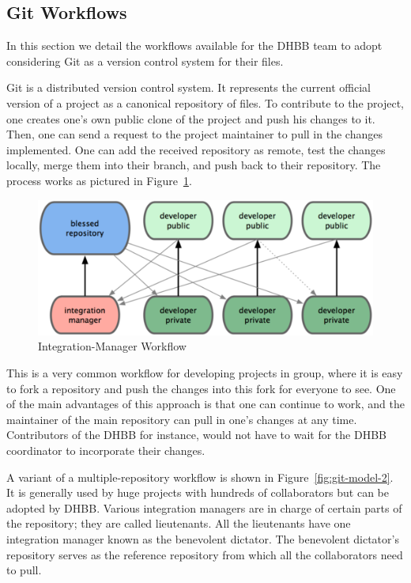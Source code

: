 \subsection{Git Workflows}

In this section we detail the workflows available for the DHBB team to
adopt considering Git as a version control system for their files.

Git is a distributed version control system. It represents the current
official version of a project as a canonical repository of files. To
contribute to the project, one creates one's own public clone of the
project and push his changes to it. Then, one can send a request to
the project maintainer to pull in the changes implemented. One can add
the received repository as remote, test the changes locally, merge
them into their branch, and push back to their repository. The process
works as pictured in Figure~\ref{fig:git-model-1}.

\begin{figure}[thbp]
  \centering
  \includegraphics[width=.8\textwidth]{git-model-1.png}
  \caption{Integration-Manager Workflow}\label{fig:git-model-1}
\end{figure}

This is a very common workflow for developing projects in group, where
it is easy to fork a repository and push the changes into this fork
for everyone to see. One of the main advantages of this approach is
that one can continue to work, and the maintainer of the main
repository can pull in one's changes at any time. Contributors of the
DHBB for instance, would not have to wait for the DHBB coordinator to
incorporate their changes.

A variant of a multiple-repository workflow is shown in
Figure~\ref{fig:git-model-2}. It is generally used by huge projects
with hundreds of collaborators but can be adopted by DHBB. Various
integration managers are in charge of certain parts of the repository;
they are called lieutenants. All the lieutenants have one integration
manager known as the benevolent dictator. The benevolent dictator's
repository serves as the reference repository from which all the
collaborators need to pull.

